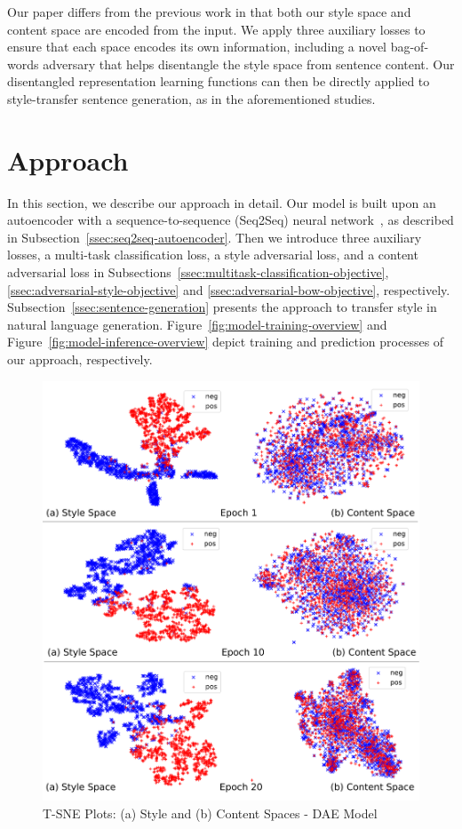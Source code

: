 \documentclass[11pt,a4paper]{article}
\begin{document}
Our paper differs from the previous work in that both our style space and content space are encoded from the input. We apply three auxiliary losses to ensure that each space encodes its own information, including a novel bag-of-words adversary that helps disentangle the style space from sentence content. Our disentangled representation learning functions can then be directly applied to style-transfer sentence generation, as in the aforementioned studies.


\section{Approach}

In this section, we describe our approach in detail. Our model is built upon an autoencoder with a sequence-to-sequence (Seq2Seq) neural network~\cite{sutskever2014sequence}, as described in Subsection~\ref{ssec:seq2seq-autoencoder}. Then we introduce three auxiliary losses, a multi-task classification loss, a style adversarial loss, and a content adversarial loss in Subsections~\ref{ssec:multitask-classification-objective}, \ref{ssec:adversarial-style-objective} and \ref{ssec:adversarial-bow-objective}, respectively. Subsection~\ref{ssec:sentence-generation} presents the approach to transfer style in natural language generation. Figure~\ref{fig:model-training-overview} and Figure~\ref{fig:model-inference-overview} depict training and prediction processes of our approach, respectively.


\begin{figure}[ht]
	\captionsetup{justification=centering}
	\includegraphics[width=\linewidth]{latent-spaces-dae}
	\caption{T-SNE Plots: (a) Style and (b) Content Spaces - DAE Model}
	\label{fig:dae-tsne}
\end{figure}
\end{document}

